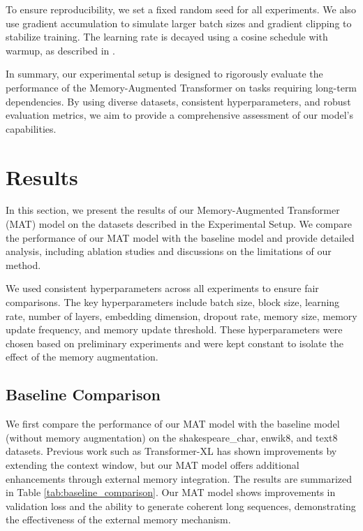 \documentclass{article} %
\begin{document}
To ensure reproducibility, we set a fixed random seed for all experiments. We also use gradient accumulation to simulate larger batch sizes and gradient clipping to stabilize training. The learning rate is decayed using a cosine schedule with warmup, as described in \citet{Loshchilov2016SGDRSG}.

In summary, our experimental setup is designed to rigorously evaluate the performance of the Memory-Augmented Transformer on tasks requiring long-term dependencies. By using diverse datasets, consistent hyperparameters, and robust evaluation metrics, we aim to provide a comprehensive assessment of our model's capabilities.

\section{Results}
\label{sec:results}
In this section, we present the results of our Memory-Augmented Transformer (MAT) model on the datasets described in the Experimental Setup. We compare the performance of our MAT model with the baseline model and provide detailed analysis, including ablation studies and discussions on the limitations of our method.

We used consistent hyperparameters across all experiments to ensure fair comparisons. The key hyperparameters include batch size, block size, learning rate, number of layers, embedding dimension, dropout rate, memory size, memory update frequency, and memory update threshold. These hyperparameters were chosen based on preliminary experiments and were kept constant to isolate the effect of the memory augmentation.

\subsection{Baseline Comparison}
We first compare the performance of our MAT model with the baseline model (without memory augmentation) on the shakespeare\_char, enwik8, and text8 datasets. Previous work such as Transformer-XL \citep{dai2019transformerxl} has shown improvements by extending the context window, but our MAT model offers additional enhancements through external memory integration. The results are summarized in Table \ref{tab:baseline_comparison}. Our MAT model shows improvements in validation loss and the ability to generate coherent long sequences, demonstrating the effectiveness of the external memory mechanism.
\end{document}
